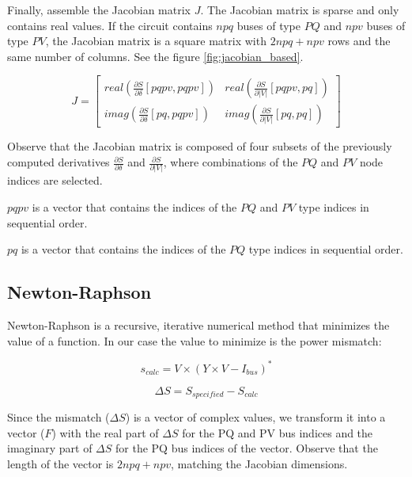 \documentclass[a4paper,twoside,fleqn]{tufte-book}
\begin{document}
Finally, assemble the Jacobian matrix $J$. The Jacobian matrix is sparse and only contains real values. If the circuit contains $npq$ buses of type $PQ$ and $npv$ buses of type $PV$, the Jacobian matrix is a square matrix with $2 npq + npv$ rows and the same number of columns. See the figure \ref{fig:jacobian_based}.

\begin{equation}
J=
\left[
\begin{array}{cc}
real\left(\frac{\partial S}{\partial \delta}[pqpv, pqpv]\right) &
real\left(\frac{\partial S}{\partial |V|}[pqpv, pq]\right) \\
imag\left(\frac{\partial S}{\partial \delta}[pq, pqpv]\right) &
imag\left(\frac{\partial S}{\partial |V|}[pq, pq]\right)
\end{array}
\right]
\end{equation}

Observe that the Jacobian matrix is composed of four subsets of the previously computed derivatives $\frac{\partial S}{\partial \delta}$ and $\frac{\partial S}{\partial |V|}$, where combinations of the $PQ$ and $PV$ node indices are selected.

$pqpv$ is a vector that contains the indices of the $PQ$ and $PV$ type indices in sequential order.

$pq$ is a vector that contains the indices of the $PQ$  type indices in sequential order.

\newpage
\subsection{Newton-Raphson}

Newton-Raphson is a recursive, iterative numerical method that minimizes the value of a function. In our case the value to minimize is the power mismatch:

\begin{equation}
s_{calc} = V \times (Y \times V - I_{bus})^*
\label{eq:nr_Scalc}
\end{equation}

\begin{equation}
\Delta S = S_{specified} - S_{calc} 
\end{equation}


Since the mismatch ($\Delta S$) is a vector of complex values, we transform it into a vector ($F$) with the real part of $\Delta S$ for the PQ and PV bus indices and the imaginary part of $\Delta S$ for the PQ bus indices of the vector. Observe that the length of the vector is $2npq+npv$, matching the Jacobian dimensions.
\end{document}
